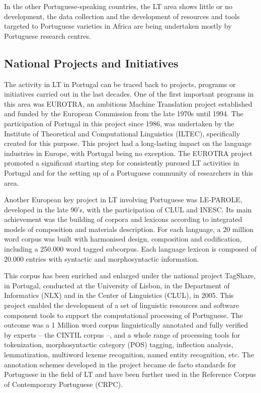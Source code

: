\documentclass[]{../metanetpaper}
\begin{document}
\begin{multicols}{2}
In the other Portuguese-speaking countries, the LT area shows little or no development, the data collection and the development of resources and tools targeted to Portuguese varieties in Africa are being undertaken mostly by Portuguese research centres.

\subsection{National Projects and Initiatives}

The activity in LT in Portugal can be traced back to projects, programs or initiatives carried out in the last decades. One of the first important programs in this area was EUROTRA, an ambitious Machine Translation project established and funded by the European Commission from the late 1970s until 1994. The participation of Portugal in this project since 1986, was undertaken by the Institute of Theoretical and Computational Linguistics (ILTEC), specifically created for this purpose. This project had a long-lasting impact on the language industries in Europe, with Portugal being no exception. The EUROTRA project promoted a significant starting step for consistently pursued LT activities in Portugal and for the setting up of a Portuguese community of researchers in this area.

Another European key project in LT involving Portuguese was LE-PAROLE, developed in the late 90's, with the participation of CLUL and INESC. Its main achievement was the building of corpora and lexicons according to integrated models of composition and materials description. For each language, a 20 million word corpus was built with harmonised design, composition and codification, including a 250.000 word tagged subcorpus. Each language lexicon is composed of 20.000 entries with syntactic and morphosyntactic information.

This corpus has been enriched and enlarged under the national project TagShare, in Portugal, conducted at the University of Lisbon, in the Department of Informatics (NLX) and in the Center of Linguistics (CLUL), in 2005. This project enabled the development of a set of linguistic resources and software component tools to support the computational processing of Portuguese. The outcome was a 1 Million word corpus linguistically annotated and fully verified by experts – the CINTIL corpus\cite{cintil} –, and a whole range of processing tools for tokenization, morphosyntactic category (POS) tagging, inflection analysis, lemmatization, multiword lexeme recognition, named entity recognition, etc. The annotation schemes developed in the project became de facto standards for Portuguese in the field of LT and have been further used in the Reference Corpus of Contemporary Portuguese (CRPC). 


\end{multicols}
\end{document}
